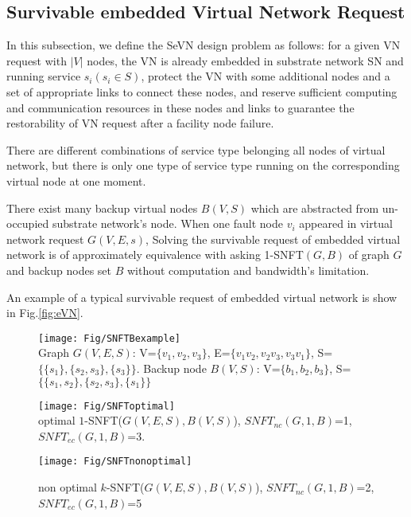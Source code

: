 \subsection{Survivable embedded Virtual Network Request}

In this subsection, we define the SeVN design problem as follows: for a given VN request with $|V|$ nodes, the VN is already embedded in substrate network SN and running service $s_i(s_i\in S)$, protect the VN with some additional nodes and a set of appropriate links to connect these nodes, and reserve sufficient computing and communication resources in these nodes and links to guarantee the restorability of VN request after a facility node failure.


There are different combinations of service type belonging all nodes of virtual network, but there is only one type of service type running on the corresponding virtual node at one moment.

There exist many backup virtual nodes $B(V,S)$ which are abstracted from un-occupied substrate network's node. When one fault node $v_i$ appeared in virtual network request $G(V,E,s)$, Solving the survivable request of embedded virtual network is of approximately equivalence with asking 1-SNFT$(G,B)$ of graph $G$ and backup nodes set $B$ without computation and bandwidth's limitation.

An example of a typical survivable request of embedded virtual network is show in Fig.\ref{fig:eVN}.

\begin{figure*}[tp]
\centering
\begin{minipage}[t]{0.3\linewidth}
\centering
\texttt{[image: Fig/SNFTBexample]}\\
\caption{Graph $G(V,E,S)$: V=$\{v_1,v_2,v_3\}$, E=$\{v_1v_2,v_2v_3,v_3v_1\}$, S=$\{\{s_1\},\{s_2,s_3\},\{s_3\}\}$. Backup node $B(V,S)$: V=$\{b_1,b_2,b_3\}$, S=$\{\{s_1,s_2\},\{s_2,s_3\},\{s_1\}\}$ }\label{fig:SNFTBexample}
\end{minipage}
\hfill
\begin{minipage}[t]{0.3\linewidth}
\centering
\texttt{[image: Fig/SNFToptimal]}\\
\caption{optimal $1$-SNFT($G(V,E,S),B(V,S)$), $SNFT_{nc}$$(G,1,B)$=1, $SNFT_{ec}$$(G,1,B)$=3.}\label{fig:SNFToptimal}
\end{minipage}
\hfill
\begin{minipage}[t]{0.3\linewidth}
\centering
\texttt{[image: Fig/SNFTnonoptimal]}\\
\caption{non optimal $k$-SNFT($G(V,E,S),B(V,S)$), $SNFT_{nc}$$(G,1,B)$=2, $SNFT_{ec}$$(G,1,B)$=5}\label{fig:SNFTnonoptimal}
\end{minipage}
\end{figure*}



